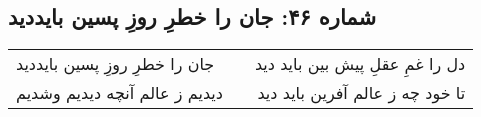 \begin{center}
\section*{شماره ۴۶: جان را خطرِ روزِ پسین بایددید}
\label{sec:046}
\begin{longtable}{l p{0.5cm} r}
جان را خطرِ روزِ پسین بایددید
&&
دل را غمِ عقلِ‌ پیش بین باید دید
\\
دیدیم ز عالم آنچه دیدیم وشدیم
&&
تا خود چه ز عالم آفرین باید دید
\\
\end{longtable}
\end{center}
